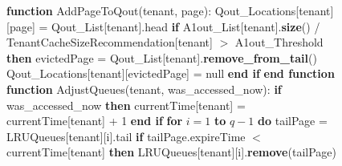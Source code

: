 \begin{figure}[htbp]
    \centering
    \begin{minipage}{\linewidth}
    \begin{algorithm}[H]
        \begin{algorithmic}
            \STATE \textbf{function} AddPageToQout(tenant, page):
            \STATE \hspace{\algorithmicindent} Qout\_Locations[tenant][page] = Qout\_List[tenant].head
            \STATE \hspace{\algorithmicindent} \textbf{if} A1out\_List[tenant].\textbf{size}() / TenantCacheSizeRecommendation[tenant] $>$ A1out\_Threshold \textbf{then}
            \STATE \hspace{\algorithmicindent} \hspace{\algorithmicindent} evictedPage = Qout\_List[tenant].\textbf{remove\_from\_tail}()
            \STATE \hspace{\algorithmicindent} \hspace{\algorithmicindent} Qout\_Locations[tenant][evictedPage] = null
            \STATE \hspace{\algorithmicindent} \textbf{end if}
            \STATE \textbf{end function}
            \STATE 
            \STATE \textbf{function} AdjustQueues(tenant, was\_accessed\_now):
            \STATE \hspace{\algorithmicindent} \textbf {if} was\_accessed\_now \textbf{then}
            \STATE \hspace{\algorithmicindent} \hspace{\algorithmicindent} currentTime[tenant] = currentTime[tenant] + 1
            \STATE \hspace{\algorithmicindent} \textbf{end if}
            \STATE \hspace{\algorithmicindent} \textbf{for} $i = 1$ \textbf{to} $q - 1$ \textbf{do}
            \STATE \hspace{\algorithmicindent} \hspace{\algorithmicindent} tailPage = LRUQueues[tenant][i].tail
            \STATE \hspace{\algorithmicindent} \hspace{\algorithmicindent} \textbf{if} tailPage.expireTime $<$ currentTime[tenant] \textbf{then}
            \STATE \hspace{\algorithmicindent} \hspace{\algorithmicindent} \hspace{\algorithmicindent} LRUQueues[tenant][i].\textbf{remove}(tailPage)

\end{algorithmic}
\end{algorithm}
\end{minipage}
\end{figure}
